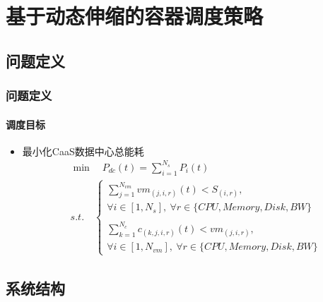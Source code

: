 \section{基于动态伸缩的容器调度策略}

\subsection{问题定义}

\begin{frame}
\frametitle{问题定义}
\framesubtitle{调度目标}
\begin{itemize}
    \item 最小化CaaS数据中心总能耗
    \begin{equation}
    \begin{align*}
            &\min\quad P_{dc}(t)=\sum_{i=1}^{N_s} P_i(t) \\
            &s.t.\quad
            \begin{cases}
            \sum_{j=1}^{N_{vm}}vm_{(j,i,r)}(t) < S_(i,r),\\
            \forall i \in [1,N_s],\ \forall r \in \{CPU,Memory,Disk,BW\} \\
            \\
            \sum_{k=1}^{N_{c}}c_{(k,j,i,r)}(t) < vm_(j,i,r),\\
            \forall i \in [1,N_{vm}],\ \forall r \in \{CPU,Memory,Disk,BW\}
            \end{cases}
    \end{align*}
    \end{equation}
\end{itemize}
\end{frame}

\subsection{系统结构}

